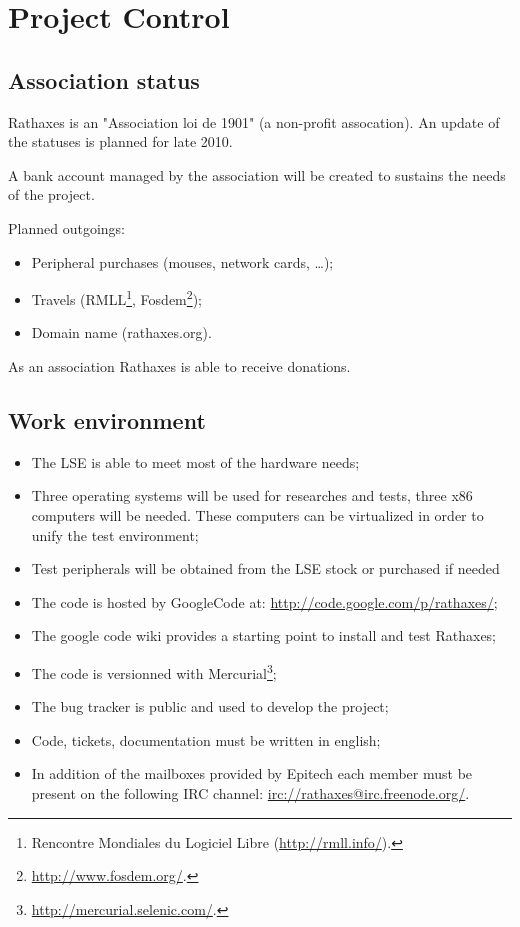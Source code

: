 \section{Project Control}

\subsection{Association status}

Rathaxes is an "Association loi de 1901" (a non-profit assocation). An update of
the statuses is planned for late 2010.

A bank account managed by the association will be created to sustains the needs
of the project.

Planned outgoings:
\begin{itemize}
\item Peripheral purchases (mouses, network cards, \ldots);
\item Travels (RMLL\footnote{Rencontre Mondiales du Logiciel Libre
(\url{http://rmll.info/}).}, Fosdem\footnote{\url{http://www.fosdem.org/}.});
\item Domain name (rathaxes.org).
\end{itemize}

As an association Rathaxes is able to receive donations.

\subsection{Work environment}

\begin{itemize}
\item The LSE is able to meet most of the hardware needs;
\item Three operating systems will be used for researches and tests, three x86
computers will be needed. These computers can be virtualized in order to unify
the test environment;
\item Test peripherals will be obtained from the LSE stock or purchased if
needed
\item The code is hosted by GoogleCode at:
\url{http://code.google.com/p/rathaxes/};
\item The google code wiki provides a starting point to install and test
Rathaxes;
\item The code is versionned with
Mercurial\footnote{\url{http://mercurial.selenic.com/}.};
\item The bug tracker is public and used to develop the project;
\item Code, tickets, documentation must be written in english;
\item In addition of the mailboxes provided by Epitech each member must be
present on the following IRC channel: \url{irc://rathaxes@irc.freenode.org/}.
\end{itemize}

